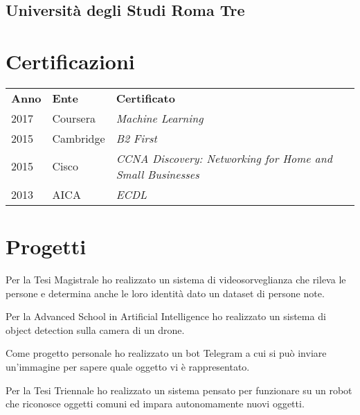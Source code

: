 \documentclass[]{deedy-resume-openfont}
\begin{document}
\begin{minipage}[t]{0.66\textwidth}
\subsection{Università degli Studi Roma Tre}
\sectionsep


\section{Certificazioni}
\begin{tabular}{@{}lll@{}}
\textbf{Anno} & \textbf{Ente} & \textbf{Certificato} \\
2017          & Coursera      & \textit{Machine Learning} \\
2015	      & Cambridge     & \textit{B2 First} \\
2015	      & Cisco         & \textit{CCNA Discovery: Networking for Home and Small Businesses} \\
2013	      & AICA          & \textit{ECDL} \\
\end{tabular}
\sectionsep


\section{Progetti}

Per la Tesi Magistrale ho realizzato un sistema di videosorveglianza che rileva le persone e determina anche le loro identità dato un dataset di persone note.

Per la Advanced School in Artificial Intelligence ho realizzato un sistema di object detection sulla camera di un drone.

Come progetto personale ho realizzato un bot Telegram a cui si può inviare un'immagine per sapere quale oggetto vi è rappresentato.

Per la Tesi Triennale ho realizzato un sistema pensato per funzionare su un robot che riconosce oggetti comuni ed impara autonomamente nuovi oggetti.

\end{minipage} 
\end{document}
